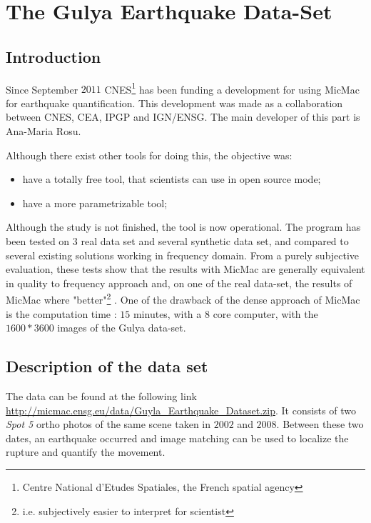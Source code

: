 \section{The Gulya Earthquake Data-Set}

\label{Gulya}

\subsection{Introduction}

Since September $2011$ CNES\footnote{Centre National d'Etudes Spatiales, the French spatial agency}
has been funding a development for using MicMac for  earthquake quantification. This development
was made as a collaboration between CNES, CEA, IPGP and IGN/ENSG. The main developer of this part
is Ana-Maria Rosu.

Although there exist other tools for doing this, the objective was:

\begin{itemize}
   \item have a totally free tool, that scientists can use in open source mode;
   \item have a more parametrizable tool;
\end{itemize}

Although the study is not finished, the tool  is now operational. The program has been
tested on $3$ real data set and several synthetic data set, and compared to several existing solutions
working in frequency domain. From a purely subjective evaluation, these tests show that the
results with MicMac are generally equivalent in quality to frequency approach and, on one of the
real data-set, the results of MicMac where "better"\footnote{i.e. subjectively easier to interpret
for scientist} . One of the drawback of the dense approach of
MicMac is the computation time : $15$ minutes, with a $8$ core computer, with the $1600*3600$
images of the Gulya data-set.



\subsection{Description of the data set}

The data can be found at the following link \url{http://micmac.ensg.eu/data/Guyla_Earthquake_Dataset.zip}.
It consists of  two \emph{Spot 5} ortho photos of the same scene taken in $2002$ and
$2008$. Between these two dates, an earthquake occurred and image matching can be used to
localize the rupture and quantify the movement.

